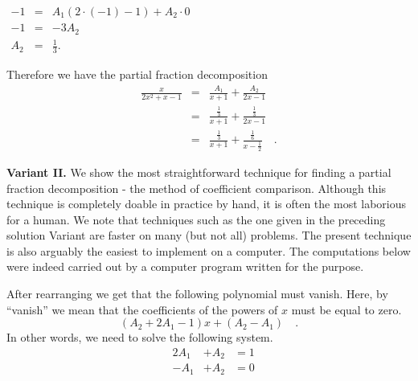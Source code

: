 {\begin{itemize}
$\begin{array}{rcl}
\displaystyle -1&=&\displaystyle A_1(2\cdot (-1)- 1) + A_2\cdot 0 \\
\displaystyle -1&=&\displaystyle -3A_2\\
\displaystyle A_2&=&\displaystyle \frac{1}{3}.
\end{array}
$
\end{itemize}
Therefore we have the partial fraction decomposition
\[
\begin{array}{rcl}
\displaystyle \frac{x}{2x^2+x-1}&=&\displaystyle \frac{A_1}{x+1}+ \frac{A_2}{2x-1}\\
&=&\displaystyle \frac{\frac{1}{3}}{x+1}+ \frac{\frac{1}{3}}{2x-1}\\
&=&\displaystyle  \frac{\frac{1}{3}}{x+1} +\frac{\frac{1}{6}}{x-\frac{1}{2}}\quad .
\end{array}
\]


\textbf{Variant II.} 
We show the most straightforward technique for finding a partial fraction decomposition - the method of coefficient comparison. Although this technique is completely doable in practice by hand, it is often the most laborious for a human. We note that techniques such as the one given in the preceding solution Variant are faster on many (but not all) problems. The present technique is also arguably the easiest to implement on a computer. The computations below were indeed carried out by a computer program written for the purpose. 

After rearranging we get that the following polynomial must vanish. Here, by ``vanish'' we mean that the coefficients of the powers of $x$ must be equal to zero.
\[(A_{2} +2A_{1} -1)x +(A_{2} -A_{1} )\quad .
\]
In other words, we need to solve the following system.
\[
\begin{array}{llll} & 2A_{1} & +A_{2} & =1\\ & -A_{1} & +A_{2} & =0\\\end{array}
\] 

}
